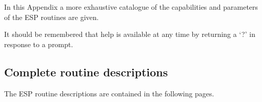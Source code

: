 \documentclass[twoside,11pt]{article}
\begin{document}
In this Appendix a more exhaustive catalogue of the capabilities and parameters
of the ESP routines are given. 

It should be remembered that help is available at any time by returning a 
`?' in response to a prompt.

\subsection{Complete routine descriptions}
\label{app:descriptions}

The ESP routine descriptions are contained in the following pages.










\newlength{\sstbannerlength}
\newlength{\sstcaptionlength}
\newlength{\sstexampleslength}
\newlength{\sstexampleswidth}

\end{document}

